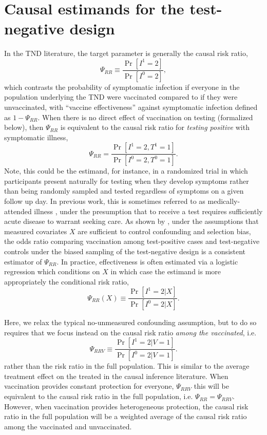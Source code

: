 \documentclass[11pt]{article}
\begin{document}
\section{Causal estimands for the test-negative design} \label{sec:estimands}
In the TND literature, the target parameter is generally the causal risk ratio,
\begin{equation*}
    \Psi_{RR} \equiv \dfrac{\Pr[I^1 = 2]}{\Pr[I^0 = 2]},
\end{equation*}
which contrasts the probability of symptomatic infection if everyone in the population underlying the TND were vaccinated compared to if they were unvaccinated, with ``vaccine effectiveness'' against symptomatic infection defined as $1 - \Psi_{RR}$. When there is no direct effect of vaccination on testing (formalized below), then $\Psi_{RR}$ is equivalent to the causal risk ratio for \textit{testing positive} with symptomatic illness,
\begin{equation*}
    \Psi_{RR} = \dfrac{\Pr[I^1 = 2, T^1 = 1]}{\Pr[I^0 = 2, T^0 = 1]}.
\end{equation*}
Note, this could be the estimand, for instance, in a randomized trial in which participants present naturally for testing when they develop symptoms rather than being randomly sampled and tested regardless of symptoms on a given follow up day. In previous work, this is sometimes referred to as medically-attended illness \cite{jackson_test-negative_2013}, under the presumption that to receive a test requires sufficiently acute disease to warrant seeking care. As shown by  \cite{schnitzer_estimands_2022}, under the assumptions that measured covariates $X$ are sufficient to control confounding and selection bias, the odds ratio comparing vaccination among test-positive cases and test-negative controls under the biased sampling of the test-negative design is a consistent estimator of $\Psi_{RR}$. In practice, effectiveness is often estimated via a logistic regression which conditions on $X$ in which case the estimand is more appropriately the conditional risk ratio,
\begin{equation*}
    \Psi_{RR}(X) \equiv \dfrac{\Pr[I^1 = 2 | X]}{\Pr[I^0 = 2 | X]}.
\end{equation*}

Here, we relax the typical no-unmeasured confounding assumption, but to do so requires that we focus instead on the causal risk ratio \textit{among the vaccinated}, i.e.
\begin{equation*}
    \Psi_{RRV} \equiv \dfrac{\Pr[I^1 = 2 | V = 1]}{\Pr[I^0 = 2 | V = 1]} .
\end{equation*}
rather than the risk ratio in the full population. This is similar to the average treatment effect on the treated in the causal inference literature. When vaccination provides constant protection for everyone, $\Psi_{RRV}$ this will be equivalent to the causal risk ratio in the full population, i.e. $\Psi_{RR} = \Psi_{RRV}$. However, when vaccination provides heterogeneous protection, the causal risk ratio in the full population will be a weighted average of the causal risk ratio among the vaccinated and unvaccinated.
\end{document}
